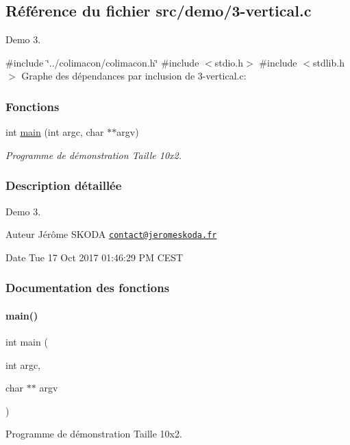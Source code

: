 \hypertarget{3-vertical_8c}{}\subsection{Référence du fichier src/demo/3-\/vertical.c}
\label{3-vertical_8c}


Demo 3.  


{\ttfamily \#include \char`\"{}../colimacon/colimacon.\+h\char`\"{}}\newline
{\ttfamily \#include $<$stdio.\+h$>$}\newline
{\ttfamily \#include $<$stdlib.\+h$>$}\newline
Graphe des dépendances par inclusion de 3-\/vertical.c\+:
\subsubsection*{Fonctions}
\begin{DoxyCompactItemize}
\item 
int \hyperlink{3-vertical_8c_a3c04138a5bfe5d72780bb7e82a18e627}{main} (int argc, char $\ast$$\ast$argv)
\begin{DoxyCompactList}\small\item\em Programme de démonstration Taille 10x2. \end{DoxyCompactList}\end{DoxyCompactItemize}


\subsubsection{Description détaillée}
Demo 3. 

\begin{DoxyAuthor}{Auteur}
Jérôme S\+K\+O\+DA \href{mailto:contact@jeromeskoda.fr}{\tt contact@jeromeskoda.\+fr} 
\end{DoxyAuthor}
\begin{DoxyDate}{Date}
Tue 17 Oct 2017 01\+:46\+:29 PM C\+E\+ST 
\end{DoxyDate}


\subsubsection{Documentation des fonctions}
\mbox{\label{3-vertical_8c_a3c04138a5bfe5d72780bb7e82a18e627}} 
\paragraph{\texorpdfstring{main()}{main()}}
{\footnotesize\ttfamily int main (\begin{DoxyParamCaption}\item[{int}]{argc,  }\item[{char $\ast$$\ast$}]{argv }\end{DoxyParamCaption})}



Programme de démonstration Taille 10x2. 

